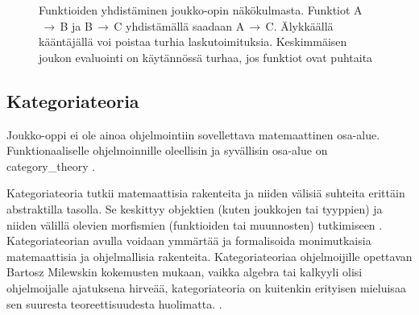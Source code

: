 \begin{figure}[htbp]
    \vspace{10pt}
    \caption{Funktioiden yhdistäminen joukko-opin näkökulmasta. Funktiot A$\,\to\,$B ja B$\,\to\,$C yhdistämällä saadaan A$\,\to\,$C. Älykkäällä kääntäjällä voi poistaa turhia laskutoimituksia. Keskimmäisen joukon evaluointi on käytännössä turhaa, jos funktiot ovat puhtaita}
    \label{fig:function_composition_in_sets}
\end{figure}


\subsection{Kategoriateoria}


Joukko-oppi ei ole ainoa ohjelmointiin sovellettava matemaattinen osa-alue. Funktionaaliselle ohjelmoinnille oleellisin ja syvällisin osa-alue on \gls{category_theory} \cite{bartosz_category_for_progamers,promises-spec-94,dear_functional_bros}.


Kategoriateoria tutkii matemaattisia rakenteita ja niiden välisiä suhteita erittäin abstraktilla tasolla. Se keskittyy objektien (kuten joukkojen tai tyyppien) ja niiden välillä olevien morfismien (funktioiden tai muunnosten) tutkimiseen \cite{bartosz_category_for_progamers}. Kategoriateorian avulla voidaan ymmärtää ja formalisoida monimutkaisia matemaattisia ja ohjelmallisia rakenteita. \cite{bartosz_category_for_progamers,promises-spec-94,category_theory}
Kategoriateoriaa ohjelmoijille opettavan Bartosz Milewskin kokemusten mukaan, vaikka algebra tai kalkyyli olisi ohjelmoijalle ajatuksena hirveää, kategoriateoria on kuitenkin erityisen mieluisaa sen suuresta teoreettisuudesta huolimatta. \cite[9]{milewski2017category}.


